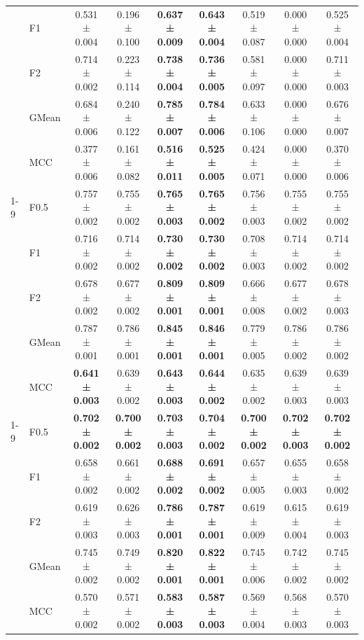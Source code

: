 \begin{table}[H]
{\begin{tabular}{llccccccc}
 & F1 & 0.531 ± 0.004 & 0.196 ± 0.100 & \textbf{0.637 ± 0.009} & \textbf{0.643 ± 0.004} & 0.519 ± 0.087 & 0.000 ± 0.000 & 0.525 ± 0.004 \\
 & F2 & 0.714 ± 0.002 & 0.223 ± 0.114 & \textbf{0.738 ± 0.004} & \textbf{0.736 ± 0.005} & 0.581 ± 0.097 & 0.000 ± 0.000 & 0.711 ± 0.003 \\
 & GMean & 0.684 ± 0.006 & 0.240 ± 0.122 & \textbf{0.785 ± 0.007} & \textbf{0.784 ± 0.006} & 0.633 ± 0.106 & 0.000 ± 0.000 & 0.676 ± 0.007 \\
 & MCC & 0.377 ± 0.006 & 0.161 ± 0.082 & \textbf{0.516 ± 0.011} & \textbf{0.525 ± 0.005} & 0.424 ± 0.071 & 0.000 ± 0.000 & 0.370 ± 0.006 \\
\cline{1-9}
\multirow[t]{5}{*}{LGBM()} & F0.5 & 0.757 ± 0.002 & 0.755 ± 0.002 & \textbf{0.765 ± 0.003} & \textbf{0.765 ± 0.002} & 0.756 ± 0.003 & 0.755 ± 0.002 & 0.755 ± 0.002 \\
 & F1 & 0.716 ± 0.002 & 0.714 ± 0.002 & \textbf{0.730 ± 0.002} & \textbf{0.730 ± 0.002} & 0.708 ± 0.003 & 0.714 ± 0.002 & 0.714 ± 0.002 \\
 & F2 & 0.678 ± 0.002 & 0.677 ± 0.002 & \textbf{0.809 ± 0.001} & \textbf{0.809 ± 0.001} & 0.666 ± 0.008 & 0.677 ± 0.002 & 0.678 ± 0.003 \\
 & GMean & 0.787 ± 0.001 & 0.786 ± 0.001 & \textbf{0.845 ± 0.001} & \textbf{0.846 ± 0.001} & 0.779 ± 0.005 & 0.786 ± 0.002 & 0.786 ± 0.002 \\
 & MCC & \textbf{0.641 ± 0.003} & 0.639 ± 0.002 & \textbf{0.643 ± 0.003} & \textbf{0.644 ± 0.002} & 0.635 ± 0.002 & 0.639 ± 0.003 & 0.639 ± 0.003 \\
\cline{1-9}
\multirow[t]{5}{*}{LogisticRegression()} & F0.5 & \textbf{0.702 ± 0.002} & \textbf{0.700 ± 0.002} & \textbf{0.703 ± 0.003} & \textbf{0.704 ± 0.002} & \textbf{0.700 ± 0.002} & \textbf{0.702 ± 0.003} & \textbf{0.702 ± 0.002} \\
 & F1 & 0.658 ± 0.002 & 0.661 ± 0.002 & \textbf{0.688 ± 0.002} & \textbf{0.691 ± 0.002} & 0.657 ± 0.005 & 0.655 ± 0.003 & 0.658 ± 0.002 \\
 & F2 & 0.619 ± 0.003 & 0.626 ± 0.003 & \textbf{0.786 ± 0.001} & \textbf{0.787 ± 0.001} & 0.619 ± 0.009 & 0.615 ± 0.004 & 0.619 ± 0.003 \\
 & GMean & 0.745 ± 0.002 & 0.749 ± 0.002 & \textbf{0.820 ± 0.001} & \textbf{0.822 ± 0.001} & 0.745 ± 0.006 & 0.742 ± 0.002 & 0.745 ± 0.002 \\
 & MCC & 0.570 ± 0.002 & 0.571 ± 0.002 & \textbf{0.583 ± 0.003} & \textbf{0.587 ± 0.003} & 0.569 ± 0.004 & 0.568 ± 0.003 & 0.570 ± 0.003 \\

\end{tabular}}
\end{table}
